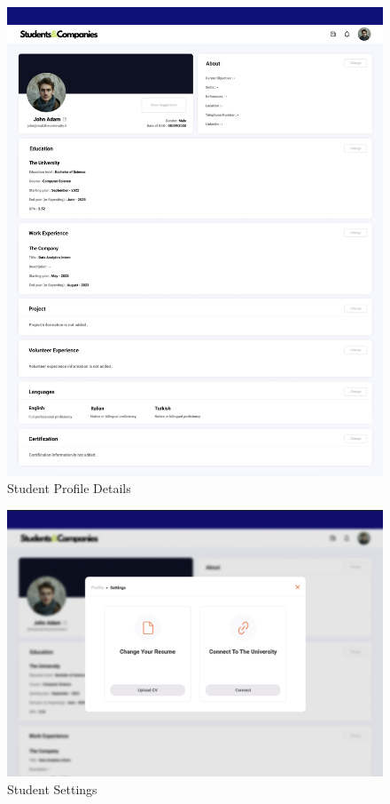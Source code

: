 \documentclass[a4paper,12pt]{article}
\begin{document}
\begin{figure}[H]
    \centering
    \includegraphics[scale = 0.35
    ]{figures/UserInterfaces/Student/Profile.png}
    \caption{Student Profile Details}
     \centering
\end{figure}
\begin{figure}[H]
    \centering
    \includegraphics[scale = 0.42]{figures/UserInterfaces/Student/Settings.png}
    \caption{Student Settings}
     \centering
\end{figure}
\end{document}
